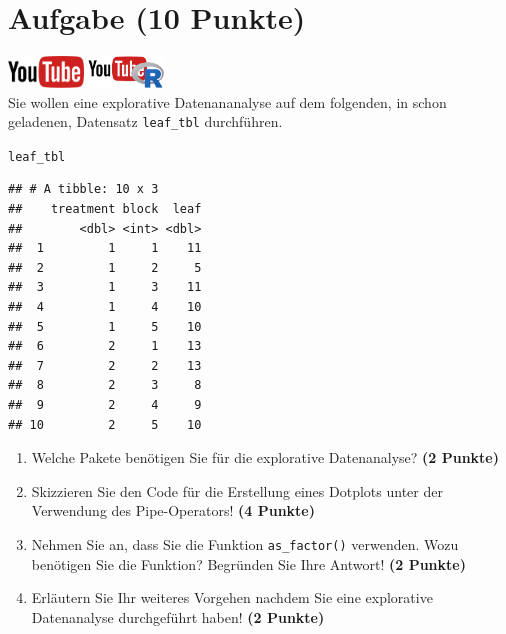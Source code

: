 \documentclass[a4paper, 10pt]{scrartcl}\usepackage[]{graphicx}\usepackage[]{xcolor}
\makeatletter
\newcommand{\hlstd}[1]{\textcolor[rgb]{0.345,0.345,0.345}{#1}}%
\newenvironment{kframe}{%
 \def\at@end@of@kframe{}%
 \ifinner\ifhmode%
  \def\at@end@of@kframe{\end{minipage}}%
  \begin{minipage}{\columnwidth}%
 \fi\fi%
 \def\FrameCommand##1{\hskip\@totalleftmargin \hskip-\fboxsep
 \colorbox{shadecolor}{##1}\hskip-\fboxsep
     \hskip-\linewidth \hskip-\@totalleftmargin \hskip\columnwidth}%
 \MakeFramed {\advance\hsize-\width
   \@totalleftmargin\z@ \linewidth\hsize
   \@setminipage}}%
 {\par\unskip\endMakeFramed%
 \at@end@of@kframe}
\newenvironment{knitrout}{}{} %
\makeatother
\begin{document}
 
\clearpage

\section{Aufgabe \hfill (10 Punkte)}

\hfill\href{https://youtu.be/WIgK_Oj_NW0}{\includegraphics[width =
  2cm]{img/youtube}}
\hspace{2Ex}
\href{https://youtu.be/JCdL7JrZo9o}{\includegraphics[width =
  2cm]{img/youtube_R}}\\[1Ex]


Sie wollen eine explorative Datenananalyse auf dem folgenden, in \Rlogo schon geladenen, Datensatz \texttt{leaf\_tbl} durchf{\"u}hren.



\begin{knitrout}
\color{fgcolor}\begin{kframe}
\begin{alltt}
\hlstd{leaf_tbl}
\end{alltt}
\begin{verbatim}
## # A tibble: 10 x 3
##    treatment block  leaf
##        <dbl> <int> <dbl>
##  1         1     1    11
##  2         1     2     5
##  3         1     3    11
##  4         1     4    10
##  5         1     5    10
##  6         2     1    13
##  7         2     2    13
##  8         2     3     8
##  9         2     4     9
## 10         2     5    10
\end{verbatim}
\end{kframe}
\end{knitrout}

\begin{enumerate}
\item Welche \Rlogo Pakete ben{\"o}tigen Sie f{\"u}r die explorative Datenanalyse?
  \textbf{(2 Punkte)} 
\item Skizzieren Sie den \Rlogo Code f{\"u}r die Erstellung eines
  Dotplots unter der Verwendung des Pipe-Operators! \textbf{(4 Punkte)}
\item Nehmen Sie an, dass Sie die Funktion \texttt{as\_factor()}
  verwenden. Wozu ben{\"o}tigen Sie die Funktion? Begr{\"u}nden Sie Ihre Antwort!
  \textbf{(2 Punkte)}
\item Erl{\"a}utern Sie Ihr weiteres Vorgehen nachdem Sie eine explorative
  Datenanalyse durchgef{\"u}hrt haben! \textbf{(2 Punkte)}
\end{enumerate}
\end{document}
